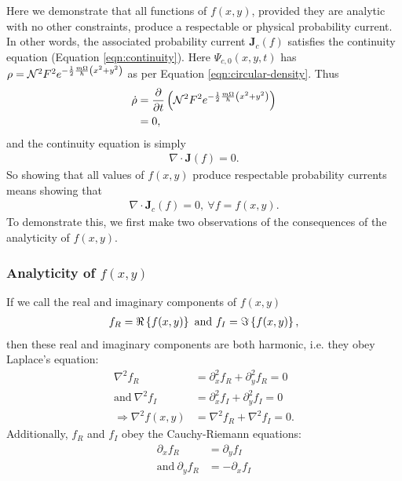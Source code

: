 Here we demonstrate that all functions of $f(x,y)$, provided they are analytic
with no other constraints, produce a respectable or physical probability
current. In other words, the associated probability current $\mathbf{J}_c(f)$
satisfies the continuity equation (Equation \ref{eqn:continuity}). Here
$\Psi_{c,0}(x, y, t)$ has $\rho = \mathcal{N}^2 F^2 e^{- \frac{1}{2} \frac{m \Omega}{\hbar}
\left( x^2 + y^2 \right)}$ as per Equation \ref{eqn:circular-density}. Thus
\begin{align}
    \dot \rho &= \frac{\partial}{\partial t} \left( \mathcal{N}^2 F^2 e^{-
        \frac{1}{2} \frac{m \Omega}{\hbar} \left( x^2 + y^2 \right)} \right) \\
    &= 0,
\end{align}
and the continuity equation is simply
\begin{align}
    \nabla \cdot \mathbf{J}(f) = 0.
\end{align}
So showing that all values of $f(x,y)$ produce respectable probability currents
means showing that
\begin{align}
    \nabla \cdot \mathbf{J}_c(f) = 0, ~\forall f=f(x,y).
\end{align}
To demonstrate this, we first make two observations of the consequences of the
analyticity of $f(x,y)$.

\subsubsection{Analyticity of $f(x,y)$}

If we call the real and imaginary components of $f(x,y)$
\begin{align}
    f_R = \Re \left\{ f(x,y) \right\} ~\mathrm{and}~ f_I = \Im \left\{ f(x,y) \right\},
\end{align}
then these real and imaginary components are both harmonic, i.e. they obey
Laplace's equation:
\begin{align}
    \nabla^2 f_R &= \partial_x^2 f_R + \partial_y^2 f_R = 0 \\
    \mathrm{and}~ \nabla^2 f_I &= \partial_x^2 f_I + \partial_y^2 f_I = 0 \\
    \Rightarrow \nabla^2 f(x,y) &= \nabla^2 f_R + \nabla^2 f_I = 0.
\end{align}
Additionally, $f_R$ and $f_I$ obey the Cauchy-Riemann equations:
\begin{align}
    \partial_x f_R &= \partial_y f_I \\
    \mathrm{and}~ \partial_y f_R &= - \partial_x f_I
\end{align}

